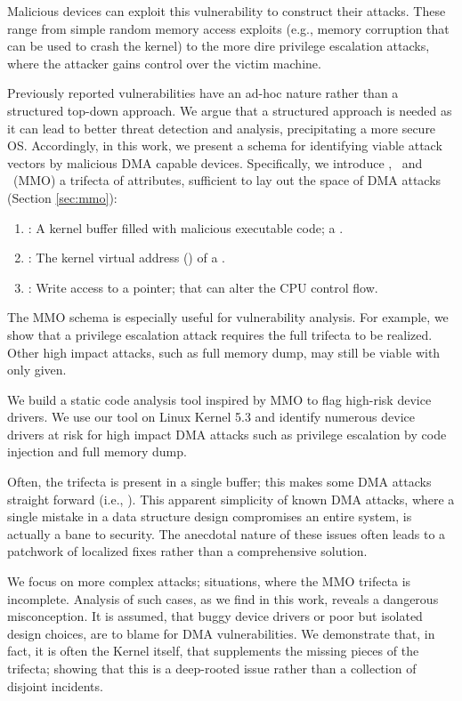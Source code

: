 Malicious devices can exploit this vulnerability to construct their attacks. These range from simple random memory access exploits (e.g., memory corruption that can be used to crash the kernel) to the more dire privilege escalation attacks, where the attacker gains control over the victim machine.

Previously reported vulnerabilities have an ad-hoc nature \cite{thunder,MMT16,Ben17b} rather than a structured top-down approach. We argue that a structured approach is needed as it can lead to better threat detection and analysis, precipitating a more secure OS. Accordingly, in this work, we present a schema for identifying viable attack vectors by malicious DMA capable devices. Specifically, we introduce \means,~\motivation{} and \oportunity~(MMO) a trifecta of attributes, sufficient to lay out the space of DMA attacks (Section \ref{sec:mmo}):
\begin{enumerate}
    \item \motivation: A kernel buffer filled with malicious executable code; a \mabaf.
    \item \means: The kernel virtual address (\kva) of a \mabaf.
    \item \oportunity: Write access to a pointer; that can alter the CPU control flow.
\end{enumerate} 

The MMO schema is especially useful for vulnerability analysis. For example, we show that a privilege escalation attack requires the full trifecta to be realized. Other high impact attacks, such as full memory dump, may still be viable with only \oportunity{} given. 

We build a static code analysis tool inspired by MMO to flag high-risk device drivers. We use our tool on Linux Kernel 5.3 and identify numerous device drivers at risk for high impact DMA attacks such as privilege escalation by code injection and full memory dump. 

Often, the trifecta is present in a single buffer; this makes some DMA attacks straight forward (i.e., \simple{}). This apparent simplicity of known DMA attacks, where a single mistake in a data structure design compromises an entire system, is actually a bane to security. The anecdotal nature of these issues often leads to a patchwork of localized fixes rather than a comprehensive solution. 

We focus on more complex attacks; situations, where the MMO trifecta is incomplete. Analysis of such cases, as we find in this work, reveals a dangerous misconception. It is assumed, that buggy device drivers or poor but isolated design choices, are to blame for DMA vulnerabilities. We demonstrate that, in fact, it is often the Kernel itself, that supplements the missing pieces of the trifecta; showing that this is a deep-rooted issue rather than a collection of disjoint incidents.

